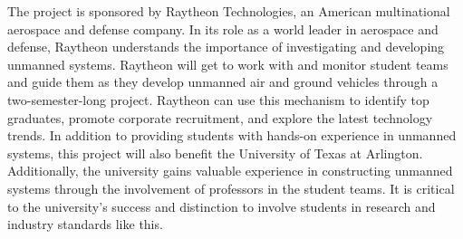 
The project is sponsored by Raytheon Technologies, an American multinational aerospace and defense company. In its role as a world leader in aerospace and defense, Raytheon understands the importance of investigating and developing unmanned systems. Raytheon will get to work with and monitor student teams and guide them as they develop unmanned air and ground vehicles through a two-semester-long project. Raytheon can use this mechanism to identify top graduates, promote corporate recruitment, and explore the latest technology trends. In addition to providing students with hands-on experience in unmanned systems, this project will also benefit the University of Texas at Arlington. Additionally, the university gains valuable experience in constructing unmanned systems through the involvement of professors in the student teams. It is critical to the university's success and distinction to involve students in research and industry standards like this.
